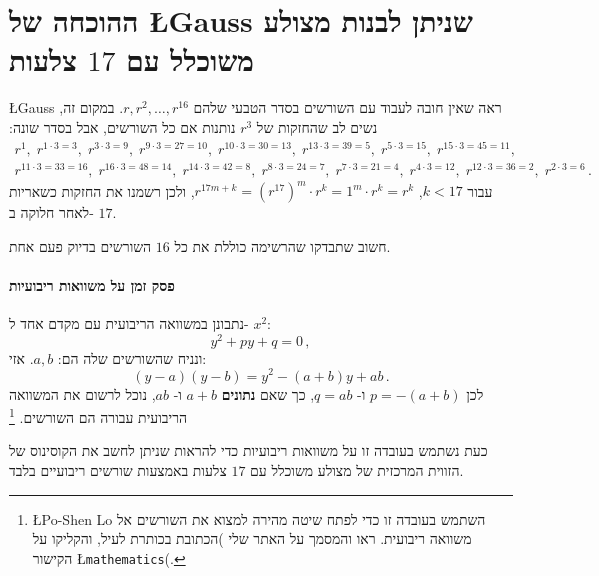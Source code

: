 \documentclass[11pt,a4paper]{article}
\newenvironment{form}[1]{%
\begin{displaymath}%
\renewcommand{\arraystretch}{#1}%
\begin{array}{lcl}}%
{\end{array}%
\end{displaymath}%
}
\begin{document}
\section{ההוכחה של 
\L{Gauss}
שניתן לבנות מצולע משוכלל עם 
$17$
צלעות
}\label{s.gauss}
\L{Gauss}
ראה שאין חובה לעבוד עם השורשים בסדר הטבעי שלהם
$r,r^2,\ldots,r^{16}$. 
במקום זה, נשים לב שהחזקות של
$r^3$
נותנות אם כל השורשים, אבל בסדר שונה:
\begin{form}{1.2}
r^1, \;r^{1\cdot 3 =3},\; r^{3\cdot 3=9},\; r^{9\cdot 3=27=10},\; r^{10\cdot 3=30=13},\; r^{13\cdot 3=39=5},\; r^{5\cdot 3=15},\; r^{15\cdot 3=45=11},&&\\
r^{11\cdot 3 =33=16}, \;r^{16\cdot 3=48=14},\; r^{14\cdot 3=42=8},\; r^{8\cdot 3=24=7},\;r^{7\cdot 3=21=4},\; r^{4\cdot 3=12},\; r^{12\cdot 3=36=2},\; r^{2\cdot 3=6}\,.&&
\end{form}
עבור
$k<17$, $r^{17m+k}=(r^{17})^m\cdot r^k=1^m\cdot r^k=r^k$,
ולכן רשמנו את החזקות כשאריות לאחר חלוקה ב-%
$17$.

חשוב שתבדקו שהרשימה כוללת את כל 
$16$
השורשים בדיוק פעם אחת.

\paragraph{%
פסק זמן על משוואות ריבועיות%
}
נתבונן במשוואה הריבועית עם מקדם אחד ל-%
$x^2$:
\[
y^2+py+q=0\,,
\]
ונניח שהשורשים שלה הם:
$a,b$.
אזי:
\[
(y-a)(y-b)=y^2 - (a+b)y + ab\,.
\]
לכן
$p=-(a+b)$
ו-%
$q=ab$,
כך שאם
\textbf{נתונים}
$a+b$
ו-%
$ab$,
נוכל לרשום את המשוואה הריבועית עבורה הם השורשים.%
\footnote{%
\L{Po-Shen Lo}
השתמש בעובדה זו כדי לפתח שיטה מהירה למצוא את השורשים אל משוואה ריבועית. ראו
\cite{lo}
והמסמך על האתר שלי
)הכתובת בכותרת לעיל, והקליקו על הקישור
\L{\texttt{mathematics}}(.}

כעת נשתמש בעובדה זו על משוואות ריבועיות כדי להראות
שניתן לחשב את הקוסינוס של הזווית המרכזית של מצולע משוכלל עם
$17$ 
צלעות באמצעות שורשים ריבועיים בלבד.
\end{document}

